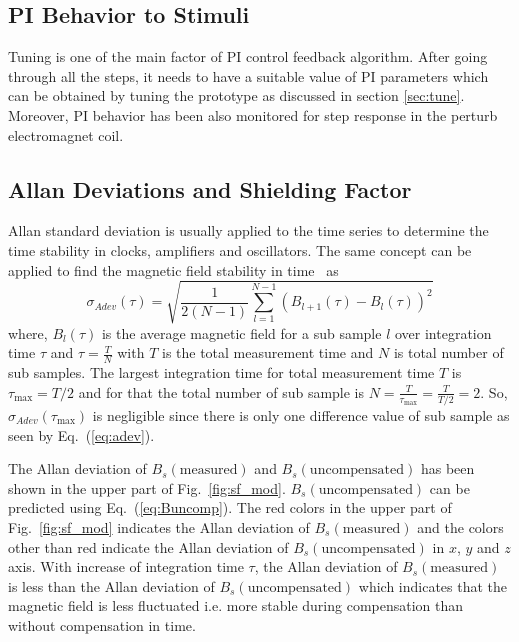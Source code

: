 \subsection{PI Behavior to Stimuli}
 Tuning is one of the main factor of PI control feedback algorithm. After going through all the steps, it needs to have a suitable value of PI parameters which can be obtained by tuning the prototype as discussed in section \ref{sec:tune}. Moreover, PI behavior has been also monitored for step response in the perturb electromagnet coil.
 
 \subsection{Allan Deviations and Shielding Factor}
 
Allan standard deviation \cite{allan} is usually applied to the time series to determine the time stability in clocks, amplifiers and oscillators. The same concept can be applied to find the magnetic field stability in time~\cite{bea} as
\begin{equation}\label{eq:adev}
    \sigma_{Adev} (\tau)=\sqrt{\frac{1}{2(N-1)}\sum_{l=1}^{N-1} \left(B_{l+1}(\tau)-B_l(\tau)\right)^2}
\end{equation}
where, $B_l(\tau)$ is the average magnetic field for a sub sample $l$ over integration time $\tau$ and $\tau = \frac{T}{N}$ with $T$ is the total measurement time and $N$ is total number of sub samples. The largest integration time for total measurement time $T$ is $\tau_{\text{max}}=T/2$ and for that the total number of sub sample is $N = \frac{T}{\tau_{\text{max}}}=\frac{T}{T/2}=2$. So, $\sigma_{Adev}(\tau_{\text{max}})$ is negligible since there is only one difference value of sub sample as seen by Eq.~(\ref{eq:adev}).

The Allan deviation of $B_s(\text{measured})$ and $B_s(\text{uncompensated})$ has been shown in the upper part of Fig.~\ref{fig:sf_mod}. $B_s(\text{uncompensated})$ can be predicted using Eq.~(\ref{eq:Buncomp}). The red colors in the upper part of Fig.~\ref{fig:sf_mod} indicates the Allan deviation of $B_s(\text{measured})$ and the colors other than red indicate the  Allan deviation of $B_s(\text{uncompensated})$ in $x$, $y$ and $z$ axis. With increase of integration time $\tau$, the Allan deviation of $B_s(\text{measured})$ is less than the  Allan deviation of $B_s(\text{uncompensated})$ which indicates that the magnetic field is less fluctuated i.e. more stable during compensation than without compensation in time. 

